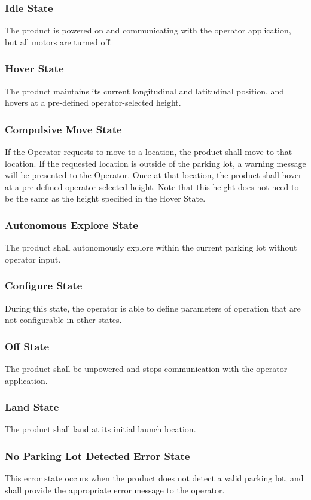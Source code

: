 \documentclass{article}
\begin{document}
\subsubsection{Idle State}
\label{Idle State}
The product is powered on and communicating with the operator application, but all motors are turned off. 
\subsubsection{Hover State}
\label{Hover State}
The product maintains its current longitudinal and latitudinal position, and hovers at a pre-defined operator-selected height. 
\subsubsection{Compulsive Move State}
\label{Compulsive Move State}
If the Operator requests to move to a location, the product shall move to that location. If the requested location is outside of the parking lot, a warning message will be presented to the Operator. Once at that location, the product shall hover at a pre-defined operator-selected height. Note that this height does not need to be the same as the height specified in the Hover State. 
\subsubsection{Autonomous Explore State}
\label{Autonomous Explore State}
The product shall autonomously explore within the current parking lot without operator input. 
\subsubsection{Configure State}
\label{Configure State}
During this state, the operator is able to define parameters of operation that are not configurable in other states. 
\subsubsection{Off State}
\label{Off State}
The product shall be unpowered and stops communication with the operator application. 
\subsubsection{Land State}
\label{Land State}
The product shall land at its initial launch location. 
\subsubsection{No Parking Lot Detected Error State}
\label{No Parking Lot Detected Error State}
This error state occurs when the product does not detect a valid parking lot, and shall provide the appropriate error message to the operator.
\end{document}
